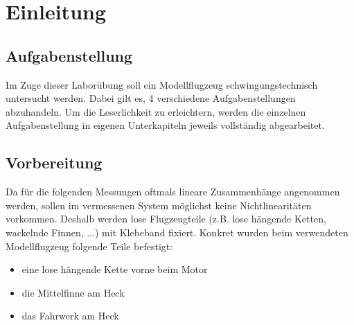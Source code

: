 \chapter{Einleitung}
\label{sec: Einleitung}

\section{Aufgabenstellung}
    Im Zuge dieser Laborübung soll ein Modellflugzeug schwingungstechnisch
    untersucht werden. Dabei gilt es, 4 verschiedene Aufgabenstellungen
    abzuhandeln. Um die Leserlichkeit zu erleichtern, werden die einzelnen
    Aufgabenstellung in eigenen Unterkapiteln jeweils vollständig abgearbeitet.

\section{Vorbereitung}
    Da für die folgenden Messungen oftmals lineare Zusammenhänge angenommen
    werden, sollen im vermessenen System möglichst keine Nichtlinearitäten
    vorkommen. Deshalb werden lose Flugzeugteile (z.B. lose hängende Ketten,
    wackelnde Finnen, ...) mit Klebeband fixiert.
    Konkret wurden beim verwendeten Modellflugzeug folgende Teile befestigt:
    \begin{itemize}
        \item eine lose hängende Kette vorne beim Motor
        \item die Mittelfinne am Heck
        \item das Fahrwerk am Heck
    \end{itemize}
